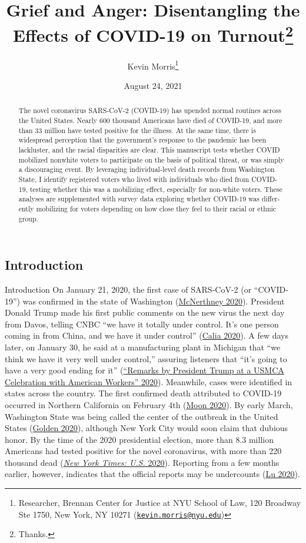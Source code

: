 \documentclass[
  12pt,
]{article}
\title{Grief and Anger: Disentangling the Effects of COVID-19 on Turnout\thanks{Thanks.}}
\author{Kevin Morris\footnote{Researcher, Brennan Center for Justice at NYU School of Law, 120 Broadway Ste 1750, New York, NY 10271 (\href{mailto:kevin.morris@nyu.edu}{\nolinkurl{kevin.morris@nyu.edu}})}}
\date{August 24, 2021}
\begin{document}
\maketitle
\begin{abstract}
The novel coronavirus SARS-CoV-2 (COVID-19) has upended normal routines across the United States. Nearly 600 thousand Americans have died of COVID-19, and more than 33 million have tested positive for the illness. At the same time, there is widespread perception that the government's response to the pandemic has been lackluster, and the racial disparities are clear. This manuscript tests whether COVID mobilized nonwhite voters to participate on the basis of political threat, or was simply a discouraging event. By leveraging individual-level death records from Washington State, I identify registered voters who lived with individuals who died from COVID- 19, testing whether this was a mobilizing effect, especially for non-white voters. These analyses are supplemented with survey data exploring whether COVID-19 was differ- ently mobilizing for voters depending on how close they feel to their racial or ethnic group.
\end{abstract}

\pagebreak

\doublespacing

\hypertarget{introduction}{%
\subsection*{Introduction}\label{introduction}}

Introduction
On January 21, 2020, the first case of SARS-CoV-2 (or ``COVID-19'') was confirmed in the state of Washington (\protect\hyperlink{ref-McNerthney2020}{McNerthney 2020}). President Donald Trump made his first public comments on the new virus the next day from Davos, telling CNBC ``we have it totally under control. It's one person coming in from China, and we have it under control'' (\protect\hyperlink{ref-Calia2020}{Calia 2020}). A few days later, on January 30, he said at a manufacturing plant in Michigan that ``we think we have it very well under control,'' assuring listeners that ``it's going to have a very good ending for it'' (\protect\hyperlink{ref-whitehouse2020}{{``Remarks by {President Trump} at a {USMCA Celebration} with {American Workers}''} 2020}). Meanwhile, cases were identified in states across the country. The first confirmed death attributed to COVID-19 occurred in Northern California on February 4th (\protect\hyperlink{ref-Moon2020}{Moon 2020}). By early March, Washington State was being called the center of the outbreak in the United States (\protect\hyperlink{ref-Golden2020}{Golden 2020}), although New York City would soon claim that dubious honor. By the time of the 2020 presidential election, more than 8.3 million Americans had tested positive for the novel coronavirus, with more than 220 thousand dead (\protect\hyperlink{ref-nyt2020}{\emph{New York Times: U.S.} 2020}). Reporting from a few months earlier, however, indicates that the official reports may be undercounts (\protect\hyperlink{ref-Lu2020}{Lu 2020}).
\end{document}
